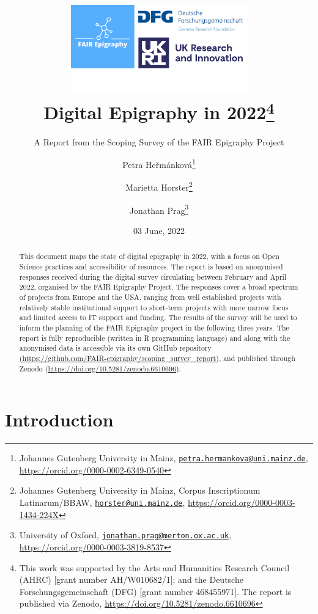 \documentclass[
  12pt,
]{scrreprt}
\title{\includegraphics[width=3in,height=\textheight]{../assets/banner.png}\\
Digital Epigraphy in 2022\footnote{This work was supported by the Arts
  and Humanities Research Council (AHRC) {[}grant number
  AH/W010682/1{]}; and the Deutsche Forschungsgemeinschaft (DFG)
  {[}grant number 468455971{]}. The report is published via Zenodo,
  \url{https://doi.org/10.5281/zenodo.6610696}}}
\subtitle{A Report from the Scoping Survey of the FAIR Epigraphy
Project}
\author{Petra Heřmánková\footnote{Johannes Gutenberg University in
  Mainz,
  \href{mailto:petra.hermankova@uni.mainz.de}{\nolinkurl{petra.hermankova@uni.mainz.de}},
  \url{https://orcid.org/0000-0002-6349-0540}} \and Marietta
Horster\footnote{Johannes Gutenberg University in Mainz, Corpus
  Inscriptionum Latinarum/BBAW,
  \href{mailto:horster@uni.mainz.de}{\nolinkurl{horster@uni.mainz.de}},
  \url{https://orcid.org/0000-0003-1434-224X}} \and Jonathan
Prag\footnote{University of Oxford,
  \href{mailto:jonathan.prag@merton.ox.ac.uk}{\nolinkurl{jonathan.prag@merton.ox.ac.uk}},
  \url{https://orcid.org/0000-0003-3819-8537}}}
\date{03 June, 2022}
\begin{document}
\maketitle
\begin{abstract}
This document maps the state of digital epigraphy in 2022, with a focus
on Open Science practices and accessibility of resources. The report is
based on anonymised responses received during the digital survey
circulating between February and April 2022, organised by the FAIR
Epigraphy Project. The responses cover a broad spectrum of projects from
Europe and the USA, ranging from well established projects with
relatively stable institutional support to short-term projects with more
narrow focus and limited access to IT support and funding. The results
of the survey will be used to inform the planning of the FAIR Epigraphy
project in the following three years. The report is fully reproducible
(written in R programming language) and along with the anonymised data
is accessible via its own GitHub repository
(\url{https://github.com/FAIR-epigraphy/scoping_survey_report}), and
published through Zenodo (\url{https://doi.org/10.5281/zenodo.6610696}).
\end{abstract}

{
\hypersetup{linkcolor=}
\setcounter{tocdepth}{2}
\tableofcontents
}
\hypertarget{introduction}{%
\chapter{Introduction}\label{introduction}}
\end{document}
